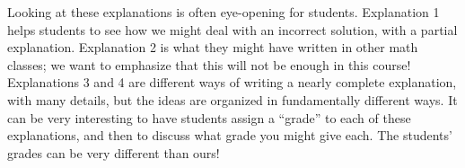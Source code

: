 \documentclass{ximera}
\begin{document}
\begin{instructorNotes}
Looking at these explanations is often eye-opening for students.  Explanation 1 helps students to see how we might deal with an incorrect solution, with a partial explanation.  Explanation 2 is what they might have written in other math classes; we want to emphasize that this will not be enough in this course!  Explanations 3 and 4 are different ways of writing a nearly complete explanation, with many details, but the ideas are organized in fundamentally different ways.  It can be very interesting to have students assign a ``grade'' to each of these explanations, and then to discuss what grade you might give each.  The students' grades can be very different than ours!
\end{instructorNotes}
\end{document}
